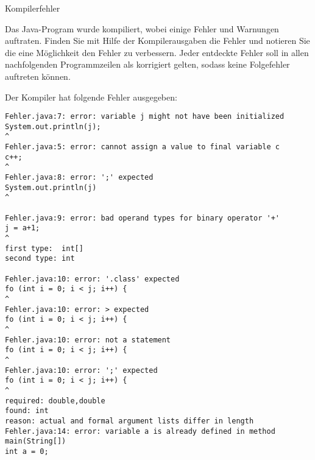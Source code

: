 \begin{exercise}{Kompilerfehler}
\begin{body}
Das Java-Program  wurde kompiliert, wobei einige Fehler und Warnungen auftraten.
Finden Sie mit Hilfe der Kompilerausgaben die Fehler und notieren Sie die eine Möglichkeit den Fehler zu verbessern.
Jeder entdeckte Fehler soll in allen nachfolgenden Programmzeilen als korrigiert gelten, sodass keine
Folgefehler auftreten können.

Der Kompiler hat folgende Fehler ausgegeben:

\begin{verbatim}
Fehler.java:7: error: variable j might not have been initialized
System.out.println(j);
^
Fehler.java:5: error: cannot assign a value to final variable c
c++;
^
Fehler.java:8: error: ';' expected
System.out.println(j)
^

Fehler.java:9: error: bad operand types for binary operator '+'
j = a+1;
^
first type:  int[]
second type: int

Fehler.java:10: error: '.class' expected
fo (int i = 0; i < j; i++) {
^
Fehler.java:10: error: > expected
fo (int i = 0; i < j; i++) {
^
Fehler.java:10: error: not a statement
fo (int i = 0; i < j; i++) {
^
Fehler.java:10: error: ';' expected
fo (int i = 0; i < j; i++) {
^
required: double,double
found: int
reason: actual and formal argument lists differ in length
Fehler.java:14: error: variable a is already defined in method main(String[])
int a = 0;
\end{verbatim}
\end{body}
\begin{solution}
\end{solution}
\end{exercise}
